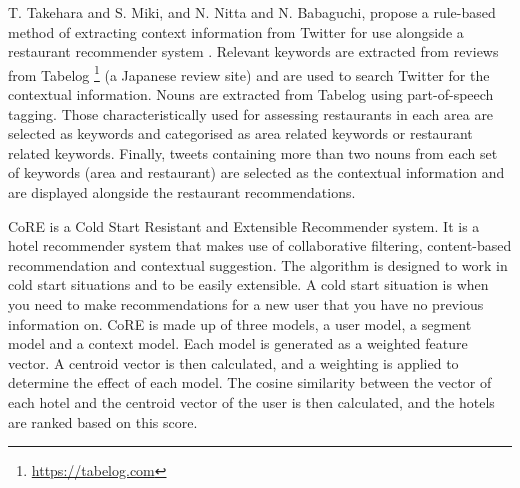 T. Takehara and S. Miki, and N. Nitta  and N. Babaguchi, propose a rule-based method of extracting context information from Twitter for use alongside a restaurant recommender system \cite{takeharaContext2012}. Relevant keywords are extracted from reviews from Tabelog \footnote{\url{https://tabelog.com}} (a Japanese review site) and are used to search Twitter for the contextual information. Nouns are extracted from Tabelog using part-of-speech tagging. Those characteristically used for assessing restaurants in each area are selected as keywords and categorised as area related keywords or restaurant related keywords. Finally, tweets containing more than two nouns from each set of keywords (area and restaurant) are selected as the contextual information and are displayed alongside the restaurant recommendations.

CoRE \cite{core2019} is a Cold Start Resistant and Extensible Recommender system. It is a hotel recommender system that makes use of collaborative filtering, content-based recommendation and contextual suggestion. The algorithm is designed to work in cold start situations and to be easily extensible. A cold start situation is when you need to make recommendations for a new user that you have no previous information on. CoRE is made up of three models, a user model, a segment model and a context model. Each model is generated as a weighted feature vector. A centroid vector is then calculated, and a weighting is applied to determine the effect of each model. The cosine similarity between the vector of each hotel and the centroid vector of the user is then calculated, and the hotels are ranked based on this score.


